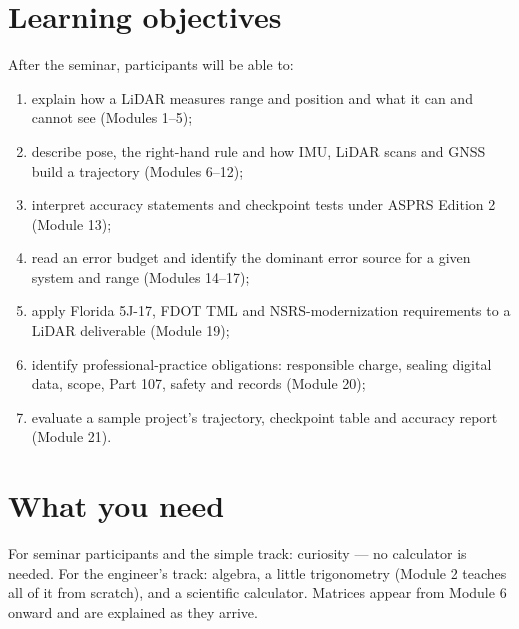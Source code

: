 \section*{Learning objectives}
After the seminar, participants will be able to:
\begin{enumerate}[leftmargin=*]
\item explain how a LiDAR measures range and position and what it can and cannot see (Modules 1--5);
\item describe pose, the right-hand rule and how IMU, LiDAR scans and GNSS build a trajectory (Modules 6--12);
\item interpret accuracy statements and checkpoint tests under ASPRS Edition 2 (Module 13);
\item read an error budget and identify the dominant error source for a given system and range (Modules 14--17);
\item apply Florida 5J-17, FDOT TML and NSRS-modernization requirements to a LiDAR deliverable (Module 19);
\item identify professional-practice obligations: responsible charge, sealing digital data, scope, Part 107, safety and records (Module 20);
\item evaluate a sample project's trajectory, checkpoint table and accuracy report (Module 21).
\end{enumerate}

\section*{What you need}
For seminar participants and the simple track: curiosity --- no calculator is needed. For the engineer's track: algebra, a little trigonometry (Module 2 teaches all of it from scratch), and a scientific calculator. Matrices appear from Module 6 onward and are explained as they arrive.

